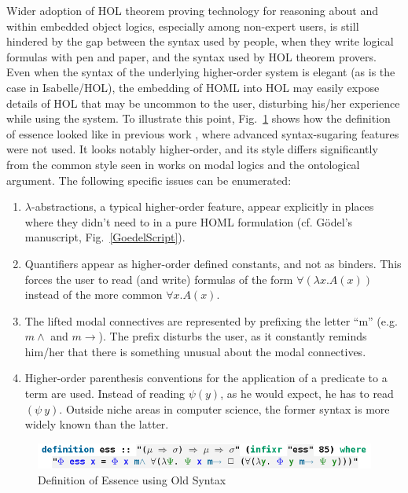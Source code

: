 \documentclass{article}
\newcommand{\imp}{{\rightarrow}}
\begin{document}
Wider adoption of HOL theorem proving technology for
reasoning about and within embedded object logics, especially among
non-expert users, is still hindered by the gap between the syntax used
by people, when they write logical formulas with pen and paper, and
the syntax used by HOL theorem provers. Even when the syntax of the
underlying higher-order system is elegant (as is the case in
Isabelle/HOL), the embedding of HOML into HOL may easily expose
details of HOL that may be uncommon to the user, disturbing his/her
experience while using the system. To illustrate this point,
Fig.~\ref{UglyEssence} shows how the definition of essence looked like
in previous work \cite{J28}, where advanced syntax-sugaring features
were not used. It looks notably higher-order, and its style differs
significantly from the common style seen in works on modal logics and
the ontological argument. The following specific issues can be
enumerated:
\begin{enumerate}
\item $\lambda$-abstractions, a typical higher-order feature, appear explicitly in places where they didn't need to in a pure HOML formulation (cf. G\"odel's manuscript, Fig.~\ref{GoedelScript}).
\item Quantifiers appear as higher-order defined constants, and not as binders. This forces the user to read (and write) formulas of the form $\forall (\lambda x. A(x))$ instead of the more common $\forall x. A(x)$.
\item The lifted modal connectives are represented by prefixing the
  letter ``m'' (e.g. $m\wedge$ and $m\imp$). The prefix disturbs the
  user, as it constantly reminds him/her that there is something
  unusual about the modal connectives.
\item Higher-order parenthesis conventions for the application of a predicate to a term are used. 
Instead of reading $\psi(y)$, as he would expect, he has to read $(\psi ~ y)$. Outside niche areas in computer science, the former syntax is more widely known than the latter.
\end{enumerate}


\begin{figure}
\centerline{\includegraphics[width=1\columnwidth]{./Images/UglyEssence.png}}
\caption{Definition of Essence using Old Syntax} \label{UglyEssence}
\end{figure}
\end{document}
